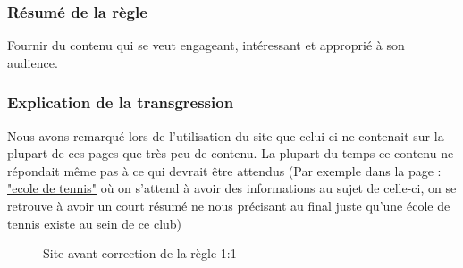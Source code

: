 \documentclass{article}[12pt]
\begin{document}
    \subsubsection*{Résumé de la règle}
    Fournir du contenu qui se veut engageant, intéressant et approprié à son audience.
    \subsubsection*{Explication de la transgression}
    Nous avons remarqué lors de l'utilisation du site que celui-ci ne contenait sur la plupart de ces pages que très peu de contenu. La plupart du temps ce contenu ne répondait même pas à ce qui devrait être attendus (Par exemple dans la page : \href{http://www.tennisclubdeparis.fr/l-ecole-de-tennis.html}{"ecole de tennis"} où on s'attend à avoir des informations au sujet de celle-ci, on se retrouve à avoir un court résumé ne nous précisant au final juste qu'une école de tennis existe au sein de ce club)
    \begin{figure}[H]
    	\centering
        \caption{Site avant correction de la règle 1:1}
    \end{figure}
    \newpage
\end{document}
